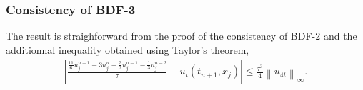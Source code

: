 \documentclass[12pt,a4paper]{article}
\newcommand{\ninf}[1]{\left\| {#1} \right\|_\infty}
\newcommand{\abs}[1]{\left\vert {#1} \right\vert}
\begin{document}
		\subsubsection{Consistency of BDF-3}

The result is straighforward from the proof of the consistency of BDF-2 and the additionnal inequality obtained using Taylor's theorem,
\begin{align*}
\abs{ \frac{\frac{11}{6} u_j^{n+1} - 3 u_j^n + \frac{3}{2} u_j^{n-1} - \frac{1}{3} u_j^{n-2}}{\tau} - u_t(t_{n+1},x_j) } \leq \frac{\tau^3}{4} \ninf{u_{4t}}.
\end{align*}



\newpage


\end{document}
